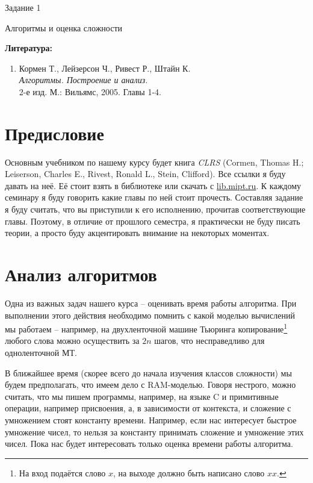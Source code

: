 \documentclass[12pt, leqno]{article}
\theoremstyle{definiton}
\theoremstyle{definition}
\theoremstyle{definition}
\begin{document}
\centerline{\LARGE Задание 1}

\medskip

\begin{center}
	{\Large Алгоритмы и оценка сложности }
\end{center}

\bigskip

{\bf Литература: }
\begin{enumerate}

\item Кормен Т., Лейзерсон Ч., Ривест Р., Штайн К. \\ {\it Алгоритмы. Построение и анализ. }\\  2-е изд. М.: Вильямс, 2005. Главы 1-4.

\end{enumerate}

\section{Предисловие}

Основным учебником по нашему курсу будет книга \emph{CLRS} (Cormen, Thomas H.; Leiserson, Charles E., Rivest, Ronald L., Stein, Clifford). Все ссылки я буду давать на неё. Её стоит взять в библиотеке или скачать с \href{http://lib.mipt.ru/book/16736/}{lib.mipt.ru}. К каждому семинару я буду говорить какие главы по ней стоит прочесть. Составляя задание я буду считать, что вы приступили к его исполнению, прочитав соответствующие главы. Поэтому, в отличие от прошлого семестра, я практически не буду писать теории, а просто буду акцентировать внимание на некоторых моментах.  

\section{Анализ алгоритмов}

	Одна из важных задач нашего курса -- оценивать время работы алгоритма. При выполнении этого действия необходимо помнить с какой моделью вычислений мы работаем -- например,  на двухленточной машине Тьюринга копирование\footnote{На вход подаётся слово $x$, на выходе должно быть написано слово $xx$.} любого слова можно осуществить за $2n$ шагов, что несправедливо для одноленточной МТ.
	
	
	В ближайшее время (скорее всего до начала изучения классов сложности) мы будем предполагать, что имеем дело с RAM-моделью. Говоря нестрого, можно считать, что мы пишем программы, например, на языке C и примитивные операции, например присвоения, а, в зависимости от контекста, и сложение с умножением стоят константу времени. Например, если нас интересует быстрое умножение чисел, то нельзя за константу принимать сложение и умножение этих чисел. Пока нас будет интересовать только оценка времени работы алгоритма.
	
\end{document}
